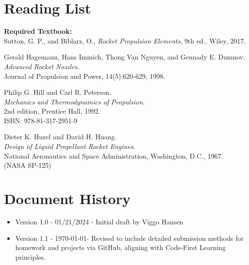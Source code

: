\documentclass[12pt]{article}
\begin{document}
\section*{Reading List}
\textbf{Required Textbook:}\\
Sutton, G. P., and Biblarz, O., \textit{Rocket Propulsion Elements}, 9th ed., Wiley, 2017.

\begin{thebibliography}{9}
Gerald Hagemann, Hans Immich, Thong Van Nguyen, and Gennady E. Dumnov.\\
\textit{Advanced Rocket Nozzles}.\\
Journal of Propulsion and Power, 14(5):620-629, 1998.

Philip G. Hill and Carl R. Peterson.\\
\textit{Mechanics and Thermodynamics of Propulsion}.\\
2nd edition, Prentice Hall, 1992.\\
ISBN: 978-81-317-2951-9

Dieter K. Huzel and David H. Huang.\\
\textit{Design of Liquid Propellant Rocket Engines}.\\
National Aeronautics and Space Administration, Washington, D.C., 1967.\\
(NASA SP-125)
\end{thebibliography}

\section*{Document History}
\begin{itemize}
    \item Version 1.0 - 01/21/2024 - Initial draft by Viggo Hansen
    \item Version 1.1 - \today - Revised to include detailed submission methods for homework and projects via GitHub, aligning with Code-First Learning principles.
\end{itemize}
\end{document}
